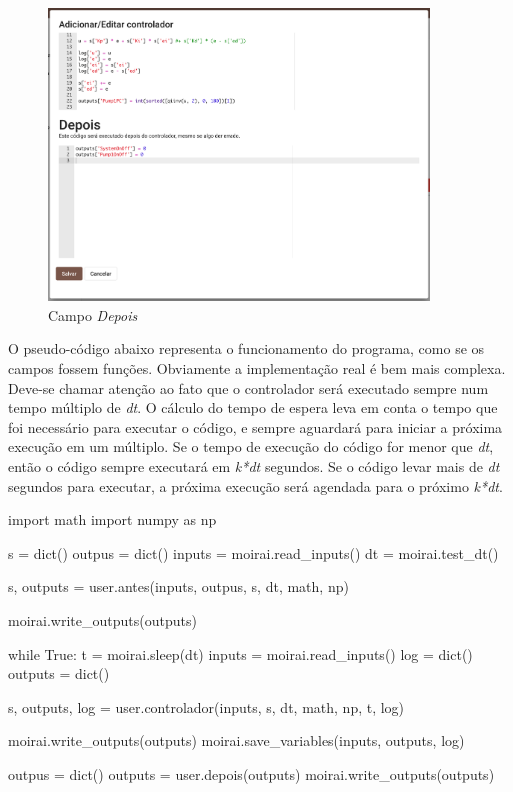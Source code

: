 \begin{figure}[ht!]
    \centering
    \includegraphics[width=0.9\textwidth]{imgs/control5}
    \caption[Campo \textit{Depois}]{Campo \textit{Depois}}%
    \label{fig:control5}
\end{figure}

O pseudo-código abaixo representa o funcionamento do programa, como se os campos
fossem funções. Obviamente a implementação real é bem mais complexa. Deve-se
chamar atenção ao fato que o controlador será executado sempre num tempo
múltiplo de \textit{dt}. O cálculo do tempo de espera leva em conta o tempo que
foi necessário para executar o código, e sempre aguardará para iniciar a próxima
execução em um múltiplo. Se o tempo de execução do código for menor que
\textit{dt}, então o código sempre executará em \textit{k*dt} segundos. Se o
código levar mais de \textit{dt} segundos para executar, a próxima execução será
agendada para o próximo \textit{k*dt}.

\newpage{}
\begin{pythoncode}
    import math
    import numpy as np

    s = dict()
    outpus = dict()
    inputs = moirai.read_inputs()
    dt = moirai.test_dt()

    s, outputs = user.antes(inputs, outpus, s, dt, math, np)
    
    moirai.write_outputs(outputs)
    
    while True:
        t = moirai.sleep(dt)
        inputs = moirai.read_inputs()
        log = dict()
        outputs = dict()
        
        s, outputs, log = user.controlador(inputs, s, dt, math, np, t, log)

        moirai.write_outputs(outputs)
        moirai.save_variables(inputs, outputs, log)
    
    outpus = dict()
    outputs = user.depois(outputs)
    moirai.write_outputs(outputs)
\end{pythoncode}

